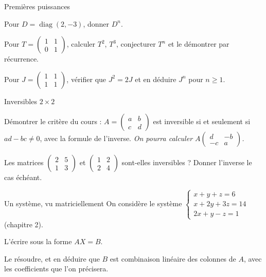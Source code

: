 \begin{exercice}[1]{Premières puissances}
\begin{questions}
  \item Pour $D=\operatorname{diag}(2,-3)$, donner $D^{n}$.
  \item Pour $T=\begin{pmatrix}1&1\\0&1\end{pmatrix}$, calculer $T^{2}$,
    $T^{3}$, conjecturer $T^{n}$ et le démontrer par récurrence.
  \item Pour $J=\begin{pmatrix}1&1\\1&1\end{pmatrix}$, vérifier que
    $J^{2}=2J$ et en déduire $J^{n}$ pour $n\geq1$.
\end{questions}
\end{exercice}

\begin{exercice}[1]{Inversibles $2\times2$}
\begin{questions}
  \item Démontrer le critère du cours : $A=\begin{pmatrix}a&b\\c&d\end{pmatrix}$
    est inversible si et seulement si $ad-bc\neq0$, avec la formule de
    l'inverse. \emph{On pourra calculer
    $A\begin{pmatrix}d&-b\\-c&a\end{pmatrix}$.}
  \item Les matrices $\begin{pmatrix}2&5\\1&3\end{pmatrix}$ et
    $\begin{pmatrix}1&2\\2&4\end{pmatrix}$ sont-elles inversibles ? Donner
    l'inverse le cas échéant.
\end{questions}
\end{exercice}

\begin{exercice}[1]{Un système, vu matriciellement}
On considère le système
$\begin{cases}x+y+z=6\\x+2y+3z=14\\2x+y-z=1\end{cases}$ (chapitre 2).
\begin{questions}
  \item L'écrire sous la forme $AX=B$.
  \item Le résoudre, et en déduire que $B$ est combinaison linéaire des
    colonnes de $A$, avec les coefficients que l'on précisera.
\end{questions}
\end{exercice}

